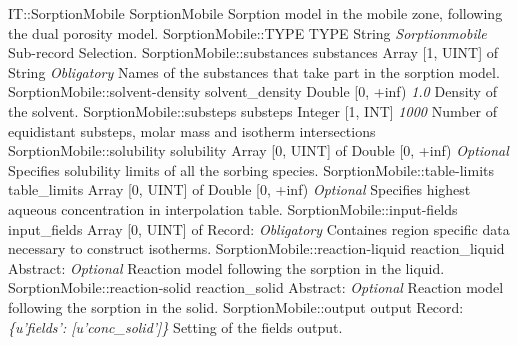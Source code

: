 \begin{RecordType}
	{IT::SorptionMobile}
	{SorptionMobile}
	{} %
	{} %
	{{{Sorption model in the mobile zone, following the dual porosity model.}}}
		\RecKey
			{SorptionMobile::TYPE}
			{TYPE}
			{{String}}
			{ \it{Sorptionmobile} }
			{{{Sub-record Selection.}}}
		\RecKey
			{SorptionMobile::substances}
			{substances}
			{{Array [1, UINT] of }{String}}
			{ \it{Obligatory} }
			{{{Names of the substances that take part in the sorption model.}}}
		\RecKey
			{SorptionMobile::solvent-density}
			{solvent{\_}density}
			{{Double [0, +inf)}}
			{ \it{1.0} }
			{{{Density of the solvent.}}}
		\RecKey
			{SorptionMobile::substeps}
			{substeps}
			{{Integer [1, INT]}}
			{ \it{1000} }
			{{{Number of equidistant substeps, molar mass and isotherm intersections}}}
		\RecKey
			{SorptionMobile::solubility}
			{solubility}
			{{Array [0, UINT] of }{Double [0, +inf)}}
			{ \it{Optional} }
			{{{Specifies solubility limits of all the sorbing species.}}}
		\RecKey
			{SorptionMobile::table-limits}
			{table{\_}limits}
			{{Array [0, UINT] of }{Double [0, +inf)}}
			{ \it{Optional} }
			{{{Specifies highest aqueous concentration in interpolation table.}}}
		\RecKey
			{SorptionMobile::input-fields}
			{input{\_}fields}
			{{Array [0, UINT] of }{Record}{: }}
			{ \it{Obligatory} }
			{{{Containes region specific data necessary to construct isotherms.}}}
		\RecKey
			{SorptionMobile::reaction-liquid}
			{reaction{\_}liquid}
			{{Abstract}{: }}
			{ \it{Optional} }
			{{{Reaction model following the sorption in the liquid.}}}
		\RecKey
			{SorptionMobile::reaction-solid}
			{reaction{\_}solid}
			{{Abstract}{: }}
			{ \it{Optional} }
			{{{Reaction model following the sorption in the solid.}}}
		\RecKey
			{SorptionMobile::output}
			{output}
			{{Record}{: }}
			{ \it{{\{}u'fields': [u'conc{\_}solid']{\}}} }
			{{{Setting of the fields output.}}}
\end{RecordType}
